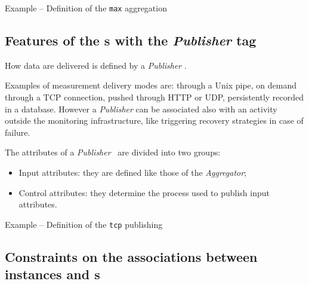 \documentclass[10pt]{article}  %
\begin{document}
\begin{table}
\caption{Example -- Definition of the {\tt \small max} aggregation \mi } 
\end{table}



\subsection{Features of the \mi s with the {\em Publisher} tag \label{sec:Publisher}}

How data are delivered is defined by a {\em Publisher} \mi .


Examples of measurement delivery modes are: through a Unix pipe, on demand through a TCP connection, pushed through HTTP or UDP, persistently recorded in a database. However a {\em Publisher} can be associated also with an activity outside the monitoring infrastructure, like triggering recovery strategies in case of failure.

The attributes of a {\em Publisher} \mi\ are divided into two groups:

\begin{itemize}
\item Input attributes: they are defined like those of the {\em Aggregator};
\item Control attributes: they determine the process used to publish input attributes.
\end{itemize}

\begin{table}
\caption{Example -- Definition of the {\tt \small tcp} publishing \mi } 
\end{table}


\subsection{Constraints on the associations between instances and \mi s}
\end{document}
